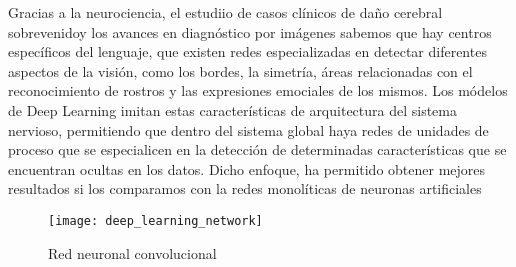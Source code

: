 Gracias a la neurociencia, el estudiio de casos clínicos de daño cerebral sobrevenidoy los avances en diagnóstico por imágenes sabemos que hay centros específicos del lenguaje, que 
existen redes especializadas en detectar diferentes aspectos de la visión, como los bordes, la simetría, áreas relacionadas con el reconocimiento de rostros y las expresiones emociales de los mismos.
Los módelos de Deep Learning imitan estas características de arquitectura del sistema nervioso, permitiendo que dentro del sistema global haya redes de unidades de proceso que se especialicen en la detección
de determinadas características que se encuentran ocultas en los datos. Dicho enfoque, ha permitido obtener mejores resultados si los comparamos con la redes monolíticas de neuronas artificiales

\begin{figure}[!h]
    \centering
    \texttt{[image: deep\_learning\_network]}
    \caption{Red neuronal convolucional \cite{imgDL}}\label{fig:deep_learning_network}
\end{figure}

\clearpage

